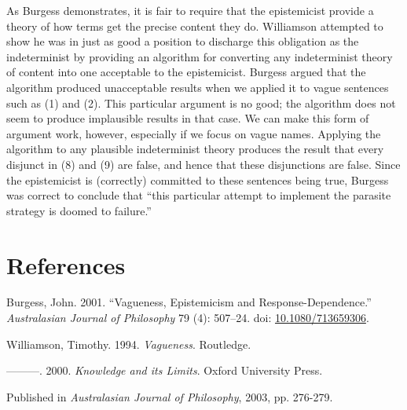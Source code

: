 \documentclass[
  10pt,
  letterpaper,
  DIV=11,
  numbers=noendperiod,
  twoside]{scrartcl}
\newlength{\cslhangindent}
\newenvironment{CSLReferences}[2] %
 {\begin{list}{}{%
  \setlength{\itemindent}{0pt}
  \setlength{\leftmargin}{0pt}
  \setlength{\parsep}{0pt}
  \ifodd #1
   \setlength{\leftmargin}{\cslhangindent}
   \setlength{\itemindent}{-1\cslhangindent}
  \fi
  \setlength{\itemsep}{#2\baselineskip}}}
 {\end{list}}
\begin{document}
As Burgess demonstrates, it is fair to require that the epistemicist
provide a theory of how terms get the precise content they do.
Williamson attempted to show he was in just as good a position to
discharge this obligation as the indeterminist by providing an algorithm
for converting any indeterminist theory of content into one acceptable
to the epistemicist. Burgess argued that the algorithm produced
unacceptable results when we applied it to vague sentences such as (1)
and (2). This particular argument is no good; the algorithm does not
seem to produce implausible results in that case. We can make this form
of argument work, however, especially if we focus on vague names.
Applying the algorithm to any plausible indeterminist theory produces
the result that every disjunct in (8) and (9) are false, and hence that
these disjunctions are false. Since the epistemicist is (correctly)
committed to these sentences being true, Burgess was correct to conclude
that ``this particular attempt to implement the parasite strategy is
doomed to failure.''

\section*{References}\label{references}

\label{refs}
\begin{CSLReferences}{1}{0}
Burgess, John. 2001. {``Vagueness, Epistemicism and
Response-Dependence.''} \emph{Australasian Journal of Philosophy} 79
(4): 507--24. doi:
\href{https://doi.org/10.1080/713659306}{10.1080/713659306}.

Williamson, Timothy. 1994. \emph{{Vagueness}}. Routledge.

---------. 2000. \emph{{Knowledge and its Limits}}. Oxford University
Press.

\end{CSLReferences}



\noindent Published in\emph{
Australasian Journal of Philosophy}, 2003, pp. 276-279.
\end{document}
